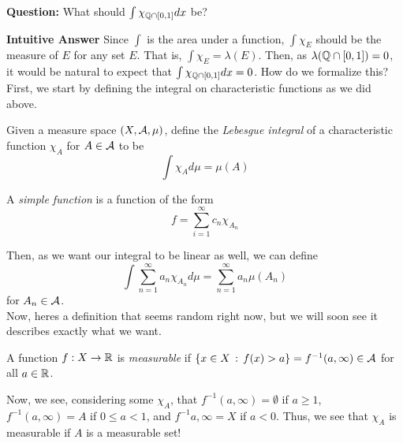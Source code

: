 \textbf{Question:} What should $\int \chi_{\Q \cap [0, 1]} dx$ be?

\textbf{Intuitive Answer} Since $\int$ is the area under a function, $\int \chi_{E}$ should be the measure of $E$ for any set $E$. That is, $\int \chi_{E} = \lambda(E)$. Then, as $\lambda(\Q \cap [0, 1]) = 0$, it would be natural to expect that $\int \chi_{\Q \cap [0, 1]} dx = 0$. How do we formalize this? First, we start by defining the integral on characteristic functions as we did above.\\

\begin{definition}
    Given a measure space $(X, \cal{A}, \mu)$, define the \emph{Lebesgue integral} of a characteristic function $\chi_{A}$ for $A \in \cal{A}$ to be
    \[ \int \chi_{A} d\mu = \mu(A) \]
\end{definition}

\begin{definition}
    A \emph{simple function} is a function of the form
    \[ f = \sum_{i = 1}^{\infty} c_n \chi_{A_n} \]
\end{definition}
Then, as we want our integral to be linear as well, we can define
\[ \int \sum_{n = 1}^{\infty} a_n \chi_{A_n} d\mu = \sum_{n = 1}^{\infty} a_n\mu(A_n) \]
for $A_n \in \cal{A}$.\\

Now, heres a definition that seems random right now, but we will soon see it describes exactly what we want.

\begin{definition}
    A function $f : X \to \R$ is \emph{measurable} if $\{x \in X \col f(x) > a\} = f^{-1}(a, \infty) \in \cal{A}$ for all $a \in \R$.
\end{definition}

Now, we see, considering some $\chi_{A}$, that $f^{-1}(a, \infty) = \emptyset$ if $a \geq 1$, $f^{-1}(a, \infty) = A$ if $0 \leq a < 1$, and $f^{-1}{a, \infty} = X$ if $a < 0$. Thus, we see that $\chi_{A}$ is measurable if $A$ is a measurable set!